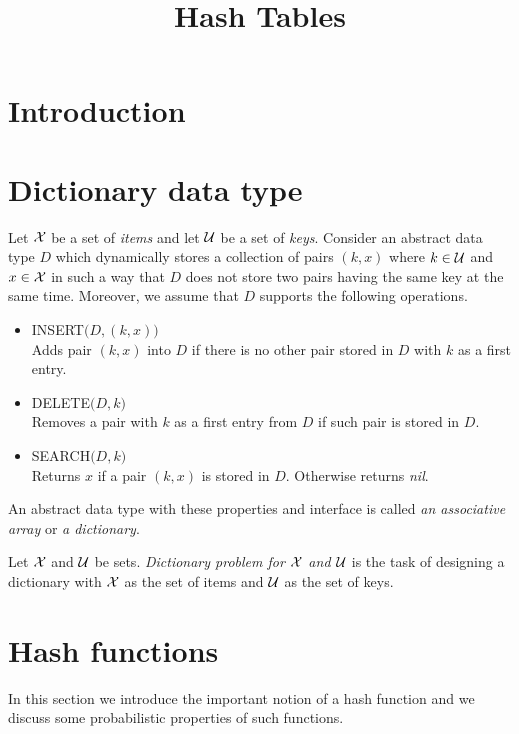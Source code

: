 


\title{Hash Tables}
\date{}
\maketitle

\section{Introduction}

\section{Dictionary data type}

\begin{definition}
Let ${\mathcal X}$ be a set of \textit{items} and let ${\mathcal U}$ be a set of \textit{keys}. Consider an abstract data type $D$ which dynamically stores a collection of pairs $(k, x)$ where $k\in {\mathcal U}$ and $x\in {\mathcal X}$ in such a way that $D$ does not store two pairs having the same key at the same time. Moreover, we assume that $D$ supports the following operations.
\begin{itemize}
\item[] \textrm{INSERT}$\big(D,(k,x)\big)$\\
Adds pair $(k,x)$ into $D$ if there is no other pair stored in $D$ with $k$ as a first entry.
\item[] \textrm{DELETE}$\big(D,k\big)$\\
Removes a pair with $k$ as a first entry from $D$ if such pair is stored in $D$.
\item[] \textrm{SEARCH}$\big(D,k\big)$\\
Returns $x$ if a pair $(k,x)$ is stored in $D$. Otherwise returns \textit{nil}. 
\end{itemize}
An abstract data type with these properties and interface is called \textit{an associative array} or \textit{a dictionary}.
\end{definition}

\begin{definition}
Let ${\mathcal X}$ and ${\mathcal U}$ be sets. \textit{Dictionary problem for ${\mathcal X}$ and ${\mathcal U}$} is the task of designing a dictionary with ${\mathcal X}$ as the set of items and ${\mathcal U}$ as the set of keys.
\end{definition}

\section{Hash functions}
\noindent
In this section we introduce the important notion of a hash function and we discuss some probabilistic properties of such functions.

